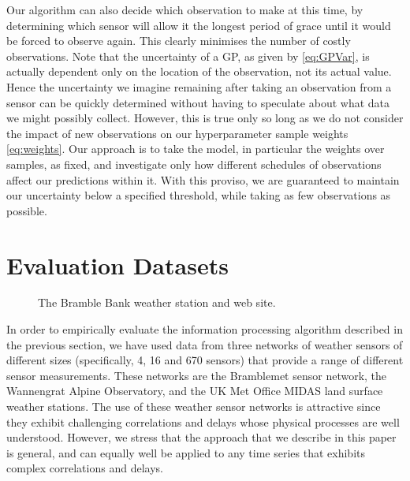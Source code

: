 \documentclass{acmsmall}
\begin{document}
Our algorithm can also decide which observation to make at this time, by determining which sensor will allow it the longest period of grace until it would be forced to observe again. This clearly minimises the number of costly observations. Note that the uncertainty of a GP, as given by \eqref{eq:GPVar}, is actually dependent only on the location of the observation, not its actual value. Hence the uncertainty we imagine remaining after taking an observation from a sensor can be quickly determined without having to speculate about what data we might possibly collect. However, this is true only so long as we do not consider the impact of new observations on our hyperparameter sample weights \eqref{eq:weights}. Our approach is to take the model, in particular the weights over samples, as fixed, and investigate only how different schedules of observations affect our predictions within it. With this proviso, we are guaranteed to maintain our uncertainty below a specified threshold, while taking as few observations as possible.

\section{Evaluation Datasets}\label{sec_implementation}

\begin{figure}
\begin{center}
 \hspace{0.25cm}
\caption{The Bramble Bank weather station and web site.}
\label{bramble_sensor}
\end{center}
\end{figure}

\noindent In order to empirically evaluate the information processing algorithm described in the previous section, we have used data from three networks of weather sensors of different sizes (specifically, 4, 16 and 670 sensors) that provide a range of different sensor measurements. These networks are the Bramblemet sensor network, the Wannengrat Alpine Observatory, and the UK Met Office MIDAS land surface weather stations. The use of these weather sensor networks is attractive since they exhibit challenging correlations and delays whose physical processes are well understood. However, we stress that the approach that we describe in this paper is general, and can equally well be applied to any time series that exhibits complex correlations and delays.
\end{document}
